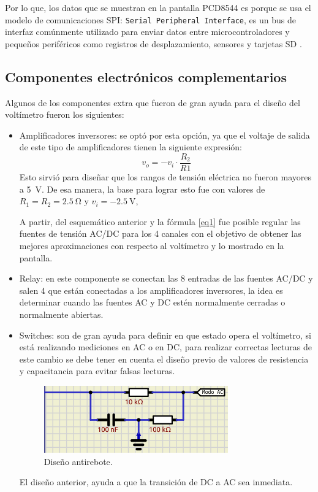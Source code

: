 Por lo que, los datos que se muestran en la pantalla PCD8544 es porque se usa el modelo de comunicaciones SPI: \texttt{Serial Peripheral Interface}, es un bus de interfaz comúnmente utilizado para enviar datos entre microcontroladores y pequeños periféricos como registros de desplazamiento, sensores y tarjetas SD \cite{web3}.
\subsection*{Componentes electrónicos complementarios}
Algunos de los componentes extra que fueron de gran ayuda para el diseño del voltímetro fueron los siguientes:
\begin{itemize}
\item Amplificadores inversores: se optó por esta opción, ya que el voltaje de salida de este tipo de amplificadores tienen la siguiente expresión:
\begin{equation}
v_o=-v_i\cdot \frac{R_2}{R1}
\label{eq1}
\end{equation}
Esto sirvió para diseñar que los rangos de tensión eléctrica no fueron mayores a \SI{5}{\volt}. De esa manera, la base para lograr esto fue con valores de $R_1=R_2=\SI{2.5}{\ohm}$ y $v_i=\SI{-2.5}{\volt}$,

A partir, del esquemático anterior y la fórmula \ref{eq1} fue posible regular las fuentes de tensión AC/DC para los 4 canales con el objetivo de obtener las mejores aproximaciones con respecto al voltímetro y lo mostrado en la pantalla.
\item Relay: en este componente se conectan las 8 entradas de las fuentes AC/DC y salen 4 que están conectadas a los amplificadores inversores, la idea es determinar cuando las fuentes AC y DC estén normalmente cerradas o normalmente abiertas.
\item Switches: son de gran ayuda para definir en que estado opera el voltímetro, si está realizando mediciones en AC o en DC, para realizar correctas lecturas de este cambio se debe tener en cuenta el diseño previo de valores de resistencia y capacitancia para evitar falsas lecturas. 
\begin{figure}[H]
\centering
\includegraphics[width=.8\linewidth]{Imagenes/3.1.png}
 \caption{Diseño antirebote.}
 \label{fig3.1}
\end{figure}
El diseño anterior, ayuda a que la transición de DC a AC sea inmediata.
\end{itemize}

